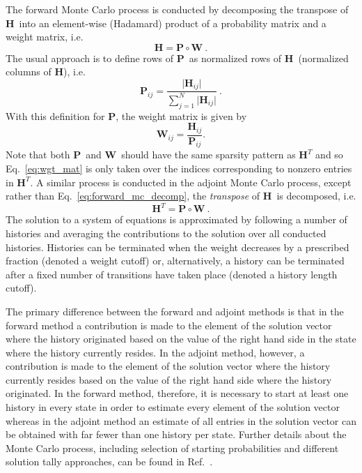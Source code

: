 \documentclass[10pt]{article}
\newcommand{\bH}{\ensuremath{\mathbf{H}}}
\newcommand{\bP}{\ensuremath{\mathbf{P}}}
\newcommand{\bW}{\ensuremath{\mathbf{W}}}
\begin{document}
The forward Monte Carlo process is conducted by decomposing the transpose of
\bH\ into an element-wise
(Hadamard) product of a probability matrix and a weight matrix, i.e.
\begin{equation}
\bH = \bP \circ \bW \:. \label{eq:forward_mc_decomp}
\end{equation}
The usual approach is to define rows of \bP\ as normalized rows of \bH\
(normalized columns of \bH), i.e.
\begin{equation}
\bP_{ij} =
\frac{\vert \bH_{ij} \vert}{\displaystyle \sum_{j=1}^{N} \vert \bH_{ij} \vert} \:.
\end{equation}
With this definition for \bP, the weight matrix is given by
\begin{equation}
\bW_{ij} = \frac{\bH_{ij}}{\bP_{ij}}. \label{eq:wgt_mat}
\end{equation}
Note that both \bP\ and \bW\ should have the same sparsity pattern
as $\bH^T$ and so Eq.~\eqref{eq:wgt_mat} is only taken over the indices corresponding
to nonzero entries in $\bH^T$.
A similar process is conducted in the adjoint Monte Carlo process,
except rather than Eq.~\eqref{eq:forward_mc_decomp}, the {\em transpose}
of \bH\ is decomposed, i.e.
\begin{equation}
\bH^T = \bP \circ \bW \:. \label{eq:adjoint_mc_decomp}
\end{equation}
The solution to a system of equations is approximated by following
a number of histories and averaging the contributions
to the solution over all conducted histories.  Histories can be terminated
when the weight decreases by a prescribed fraction (denoted a weight cutoff)
or, alternatively, a history can be terminated after a fixed number of
transitions have taken place (denoted a history length cutoff).

The primary difference
between the forward and adjoint methods is that in the forward method
a contribution is made to the element of the solution vector where the
history originated based on the value of the right hand side in the state
where the history currently resides.  In the adjoint method, however,
a contribution is made to the element of the solution vector where the
history currently resides based on the value of the right hand side
where the history originated.  In the forward method, therefore, it is
necessary to start at least one history in every state in order to
estimate every element of the solution vector whereas in the adjoint
method an estimate of all entries in the solution vector can be
obtained with far fewer than one history per state.
Further details about the Monte Carlo process, including selection
of starting probabilities and different solution tally approaches,
can be found in Ref.~\cite{slattery_13}.
\end{document}
